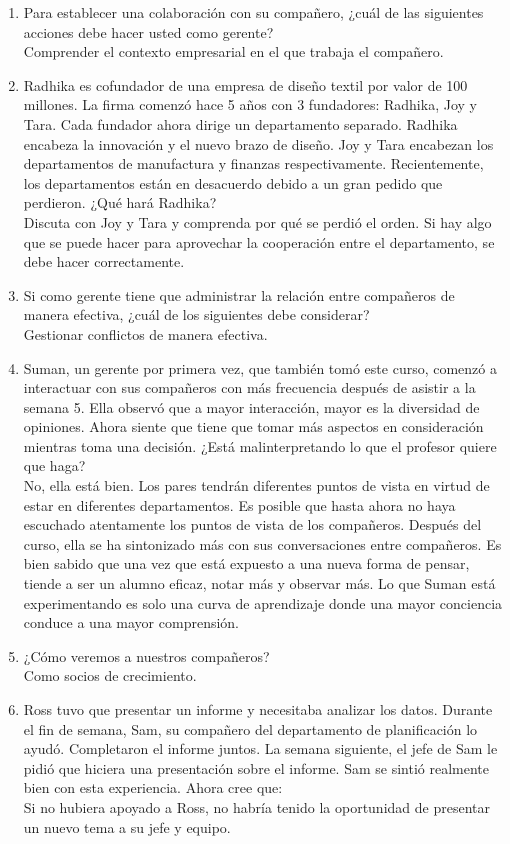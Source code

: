 \documentclass[10pt]{book}
\begin{document}
\begin{enumerate}[\bfseries 1.]
\item Para establecer una colaboración con su compañero, ¿cuál de las siguientes acciones debe hacer usted como gerente?\\
Comprender el contexto empresarial en el que trabaja el compañero.
\item Radhika es cofundador de una empresa de diseño textil por valor de 100 millones. La firma comenzó hace 5 años con 3 fundadores: Radhika, Joy y Tara. Cada fundador ahora dirige un departamento separado. Radhika encabeza la innovación y el nuevo brazo de diseño. Joy y Tara encabezan los departamentos de manufactura y finanzas respectivamente. Recientemente, los departamentos están en desacuerdo debido a un gran pedido que perdieron. ¿Qué hará Radhika?\\
Discuta con Joy y Tara y comprenda por qué se perdió el orden. Si hay algo que se puede hacer para aprovechar la cooperación entre el departamento, se debe hacer correctamente. 
\item Si como gerente tiene que administrar la relación entre compañeros de manera efectiva, ¿cuál de los siguientes debe considerar?\\
Gestionar conflictos de manera efectiva. 
\item Suman, un gerente por primera vez, que también tomó este curso, comenzó a interactuar con sus compañeros con más frecuencia después de asistir a la semana 5. Ella observó que a mayor interacción, mayor es la diversidad de opiniones. Ahora siente que tiene que tomar más aspectos en consideración mientras toma una decisión. ¿Está malinterpretando lo que el profesor quiere que haga?\\
No, ella está bien. Los pares tendrán diferentes puntos de vista en virtud de estar en diferentes departamentos. Es posible que hasta ahora no haya escuchado atentamente los puntos de vista de los compañeros. Después del curso, ella se ha sintonizado más con sus conversaciones entre compañeros. Es bien sabido que una vez que está expuesto a una nueva forma de pensar, tiende a ser un alumno eficaz, notar más y observar más. Lo que Suman está experimentando es solo una curva de aprendizaje donde una mayor conciencia conduce a una mayor comprensión.
\item ¿Cómo veremos a nuestros compañeros?\\
Como socios de crecimiento. 
\item Ross tuvo que presentar un informe y necesitaba analizar los datos. Durante el fin de semana, Sam, su compañero del departamento de planificación lo ayudó. Completaron el informe juntos. La semana siguiente, el jefe de Sam le pidió que hiciera una presentación sobre el informe. Sam se sintió realmente bien con esta experiencia. Ahora cree que:\\
Si no hubiera apoyado a Ross, no habría tenido la oportunidad de presentar un nuevo tema a su jefe y equipo.
\end{enumerate}
\end{document}
